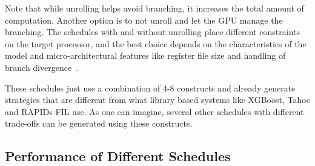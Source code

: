 Note that while unrolling helps avoid branching, it increases 
the total amount of computation. Another option is to not unroll 
and let the GPU manage the branching. The schedules with and 
without unrolling place different constraints on the target processor,
and the best choice depends on the characteristics of the model
and micro-architectural features like register file size and handling 
of branch divergence~\cite{FungMicro, MilindDivergence}.

These \Treebeard{} schedules just use a combination of 4-8 constructs and already generate strategies 
that are different from what library based systems like XGBoost, Tahoe and RAPIDs FIL use. 
As one can imagine, several other schedules with different trade-offs can be generated using 
these constructs.

\subsection{Performance of Different Schedules} 
